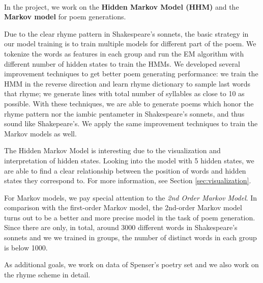 \paragraph{}
In the project, we work on the \textbf{Hidden Markov Model (HHM)} and the \textbf{Markov model} for poem generations. 

Due to the clear rhyme pattern in Shakespeare's sonnets, the basic strategy in our model training is to train multiple models for different part of the poem. We tokenize the words as features in each group and run the EM algorithm with different number of hidden states to train the HMMs. We developed several improvement techniques to get better poem generating performance: we train the HMM in the reverse direction and learn rhyme dictionary to sample last words that rhyme; we generate lines with total number of syllables as close to 10 as possible. With these techniques, we are able to generate poems which honor the rhyme pattern nor the iambic pentameter in Shakespeare's sonnets, and thus sound like Shakepeare's. We apply the same improvement techniques to train the Markov models as well.

The Hidden Markov Model is interesting due to the visualization and interpretation of hidden states. Looking into the model with 5 hidden states, we are able to find a clear relationship between the position of words and hidden states they correspond to. For more information, see Section \ref{sec:visualization}.

For Markov models, we pay special attention to the \textit{2nd Order Markov Model}. In comparison with the first-order Markov model, the 2nd-order Markov model turns out to be a better and more precise model in the task of poem generation. Since there are only, in total, around 3000 different words in Shakespeare's sonnets and we we trained in groups, the number of distinct words in each group is below 1000.

As additional goals, we work on data of Spenser's poetry set and we also work on the rhyme scheme in detail.